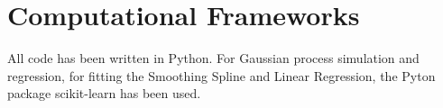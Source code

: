 \section{Computational Frameworks}

All code has been written in Python.
For Gaussian process simulation and regression, for fitting the Smoothing Spline
and Linear Regression, the Pyton package scikit-learn
has been used.














